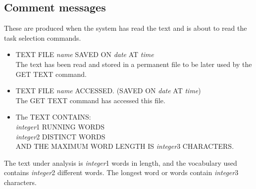 \subsection{Comment messages}
 These are produced when the system has read the text and is about to read
 the task selection commands.
\begin{itemize}
\item  TEXT FILE {\em name} SAVED ON {\em date} AT {\em time}\\
          The text has been read and stored in a permanent
          file to be later used by the GET TEXT command.
\item  TEXT FILE {\em name} ACCESSED.  (SAVED ON {\em date} AT {\em time})\\
          The GET TEXT command has accessed this file.
\item  The TEXT CONTAINS:\\
          {\em integer}1 RUNNING WORDS\\
          {\em integer}2 DISTINCT WORDS\\
          AND THE MAXIMUM WORD LENGTH IS {\em integer}3 CHARACTERS.
\end{itemize}
  The text under analysis is {\em integer}1 words in length, and the vocabulary
used contains {\em integer}2 different words. The longest word or words contain
 {\em integer}3 characters.

